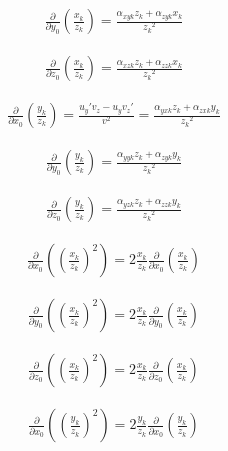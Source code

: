 \documentclass{article}
\begin{document}
\begin{align}
\frac{\partial}{\partial y_0}\left(\frac{x_k}{z_k}\right) = \frac{\alpha_{xyk} z_k + \alpha_{zyk} x_k}{{z_k}^2}
\end{align}

\begin{align}
\frac{\partial}{\partial z_0}\left(\frac{x_k}{z_k}\right) = \frac{\alpha_{xzk} z_k + \alpha_{zzk} x_k}{{z_k}^2}
\end{align}




\begin{align}
\frac{\partial}{\partial x_0}\left(\frac{y_k}{z_k}\right) = \frac{{u_y}'v_z -u_y{v_z}'}{v^2}  = \frac{\alpha_{yxk} z_k + \alpha_{zxk} y_k}{{z_k}^2}
\end{align}

\begin{align}
\frac{\partial}{\partial y_0}\left(\frac{y_k}{z_k}\right) = \frac{\alpha_{yyk} z_k + \alpha_{zyk} y_k}{{z_k}^2}
\end{align}

\begin{align}
\frac{\partial}{\partial z_0}\left(\frac{y_k}{z_k}\right) = \frac{\alpha_{yzk} z_k + \alpha_{zzk} y_k}{{z_k}^2}
\end{align}




\begin{align}
\frac{\partial}{\partial x_0}\left(\left(\frac{x_k}{z_k}\right)^2\right) = 2 \frac{x_k}{z_k} \frac{\partial}{\partial x_0}\left(\frac{x_k}{z_k}\right)
\end{align}

\begin{align}
\frac{\partial}{\partial y_0}\left(\left(\frac{x_k}{z_k}\right)^2\right) = 2 \frac{x_k}{z_k} \frac{\partial}{\partial y_0}\left(\frac{x_k}{z_k}\right)
\end{align}

\begin{align}
\frac{\partial}{\partial z_0}\left(\left(\frac{x_k}{z_k}\right)^2\right) = 2 \frac{x_k}{z_k} \frac{\partial}{\partial z_0}\left(\frac{x_k}{z_k}\right)
\end{align}




\begin{align}
\frac{\partial}{\partial x_0}\left(\left(\frac{y_k}{z_k}\right)^2\right) = 2 \frac{y_k}{z_k} \frac{\partial}{\partial x_0}\left(\frac{y_k}{z_k}\right)
\end{align}
\end{document}
